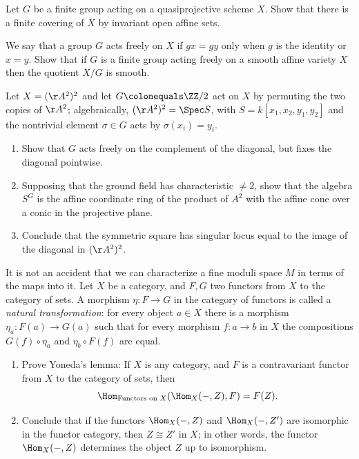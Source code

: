 \begin{exercise}\label{quotient of projective}
 Let $G$ be a
finite group acting
%
on a
quasiprojective scheme
%
$X$.
Show that there is a finite covering of $X$ by invariant open affine sets.
\end{exercise}

\begin{exercise}\label{free actions}
We say that a group $G$ acts freely on $X$ if $gx = gy$ only when $g$ is the identity or $x=y$. Show that
 if $G$ is a finite
group acting freely
%
on a smooth affine variety $X$ then the
quotient
%
$X/G$ is smooth.
\end{exercise}


\begin{exercise}
 \label{sym2A2}
 Let $X = (\AA^{2})^{2}$ and let $G \colonequals \ZZ/2$ act on $X$ by permuting the two copies of  $\AA^{2}$; algebraically,
$(\AA^{2})^{2} = \Spec S$, with $S = k[x_{1},x_{2}, y_{1}, y_{2}]$ and the nontrivial element $\sigma\in G$ acts by
$\sigma(x_{i}) = y_{i}$.
 \begin{enumerate}
\item Show that $G$ acts freely on the complement of the diagonal, but fixes the diagonal pointwise.
\item Supposing that the ground field has characteristic $\neq 2$,
show that the algebra $S^{G}$ is the affine
coordinate ring
%
of the product
of $A^2$ with the affine cone over a conic in the projective plane.
\item Conclude that the
symmetric square
%
has singular locus equal to the image of the diagonal in
$(\AA^{2})^{2}$.
\end{enumerate}
\end{exercise}

\begin{exercise}\label{Yoneda}
It is not an accident that we can characterize a
fine moduli space
%
$M$ in terms of the maps into it.
 Let $X$ be a category, and $F,G$ two functors from $X$ to the category of sets.
 A morphism $\eta: F\to G$ in the category of functors is called a
\emph{natural transformation}:
%
 for every object $a\in X$ there is a morphism $\eta_a:F(a) \to G(a)$ such that for every
 morphism $f: a\to b$ in $X$ the compositions $G(f)\circ \eta_a$ and $\eta_b\circ F(f)$
 are equal.
\begin{enumerate}
 \item Prove Yoneda's lemma:
%
If $X$ is any category, and $F$ is a contravariant functor from $X$ to the category of sets, then
 $$
 \Hom_{\hbox{\scriptsize Functors on $X$}}(\Hom_X( -, Z), F) = F(Z)
.
 $$
 \item Conclude that if the functors $\Hom_X( -, Z)$ and $\Hom_X( -, Z')$ are isomorphic in the functor category,
 then $Z \cong Z'$ in $X$;
in other words,
the functor $\Hom_X( -, Z)$ determines the object $Z$ up to isomorphism.
 \end{enumerate}
\end{exercise}

